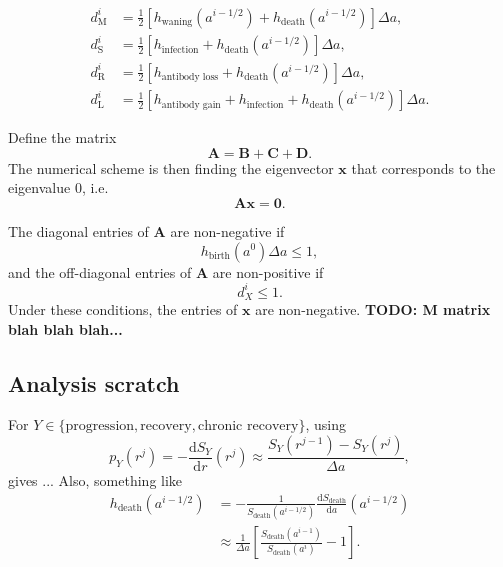 \documentclass[12pt]{article}
\renewcommand{\vec}[1]{\mathbf{#1}}
\newcommand{\mat}[1]{\mathbf{#1}}
\newcommand{\md}{\mathrm{d}}
\begin{document}
\begin{subequations}
  \begin{align}
    d_{\mathrm{M}}^i
    &= \frac{1}{2} \left[h_{\text{waning}}(a^{i - 1 / 2})
      + h_{\text{death}}(a^{i - 1 / 2})\right]
      \Delta a,
    \\
    d_{\mathrm{S}}^i
    &= \frac{1}{2} \left[h_{\text{infection}}
      + h_{\text{death}}(a^{i - 1 / 2})\right]
      \Delta a,
    \\
    d_{\mathrm{R}}^i
    &= \frac{1}{2} \left[h_{\text{antibody loss}}
      + h_{\text{death}}(a^{i - 1 / 2})\right]
      \Delta a,
    \\
    d_{\mathrm{L}}^i
    &= \frac{1}{2} \left[h_{\text{antibody gain}}
      + h_{\text{infection}}
      + h_{\text{death}}(a^{i - 1 / 2})\right]
      \Delta a.
  \end{align}
\end{subequations}

Define the matrix
\begin{equation}
  \mat{A} =
  \mat{B} + \mat{C} + \mat{D}.
\end{equation}
The numerical scheme is then finding the eigenvector
$\vec{x}$ that corresponds to the eigenvalue $0$, i.e.
\begin{equation}
  \mat{A} \vec{x} = \vec{0}.
\end{equation}


The diagonal entries of $\mat{A}$ are non-negative if
\begin{equation}
  h_{\text{birth}}(a^0) \Delta a \leq 1,
\end{equation}
and the off-diagonal entries of $\mat{A}$ are non-positive if
\begin{equation}
  d_X^i \leq 1.
\end{equation}
Under these conditions, the entries of $\vec{x}$ are non-negative.
\textbf{TODO: M matrix blah blah blah...}


\subsection{Analysis scratch}


For $Y \in \{\text{progression}, \text{recovery},
\text{chronic recovery}\}$, using
\begin{equation}
  p_Y(r^j) = - \frac{\md S_Y}{\md r} (r^j)
  \approx \frac{S_Y(r^{j - 1}) - S_Y(r^j)}{\Delta a},
\end{equation} gives ...
Also, something like
\begin{equation}
  \begin{split}
    h_{\text{death}}(a^{i - 1 / 2})
    &= - \frac{1}{S_{\text{death}} (a^{i - 1 / 2})}
    \frac{\md S_{\text{death}}}{\md a} (a^{i - 1 / 2})
    \\
    &\approx \frac{1}{\Delta a}
    \left[
      \frac{S_{\text{death}}(a^{i - 1})}{S_{\text{death}}(a^i)} - 1
    \right].
  \end{split}
\end{equation}
\end{document}
